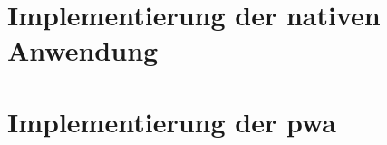 \section{Implementierung der nativen Anwendung} \label{sec:5-ios}

\newpage
\section{Implementierung der \acs{pwa}} \label{sec:5-pwa}
